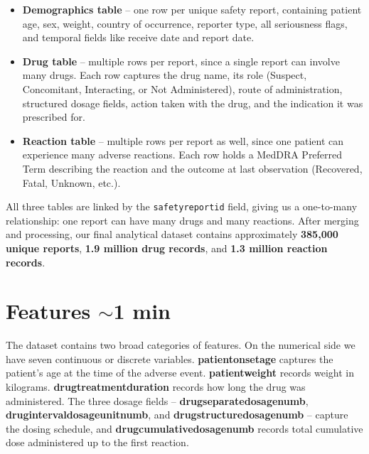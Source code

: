\documentclass[12pt, letterpaper]{article}
\begin{document}
\begin{itemize}[leftmargin=1.5em]
  \item \textbf{Demographics table} -- one row per unique safety report,
    containing patient age, sex, weight, country of occurrence, reporter type,
    all seriousness flags, and temporal fields like receive date and report date.
  \item \textbf{Drug table} -- multiple rows per report, since a single report
    can involve many drugs. Each row captures the drug name, its role
    (Suspect, Concomitant, Interacting, or Not Administered), route of
    administration, structured dosage fields, action taken with the drug, and
    the indication it was prescribed for.
  \item \textbf{Reaction table} -- multiple rows per report as well, since one
    patient can experience many adverse reactions. Each row holds a MedDRA
    Preferred Term describing the reaction and the outcome at last observation
    (Recovered, Fatal, Unknown, etc.).
\end{itemize}

All three tables are linked by the \texttt{safetyreportid} field, giving us a
one-to-many relationship: one report can have many drugs and many reactions.
After merging and processing, our final analytical dataset contains approximately
\textbf{385,000 unique reports}, \textbf{1.9 million drug records}, and
\textbf{1.3 million reaction records}.

\section{Features \hfill \textcolor{slidenumber}{\small $\sim$1 min}}

The dataset contains two broad categories of features. On the numerical side we
have seven continuous or discrete variables. \textbf{patientonsetage} captures
the patient's age at the time of the adverse event. \textbf{patientweight}
records weight in kilograms. \textbf{drugtreatmentduration} records how long the
drug was administered. The three dosage fields -- \textbf{drugseparatedosagenumb},
\textbf{drugintervaldosageunitnumb}, and \textbf{drugstructuredosagenumb} --
capture the dosing schedule, and \textbf{drugcumulativedosagenumb} records total
cumulative dose administered up to the first reaction.
\end{document}
